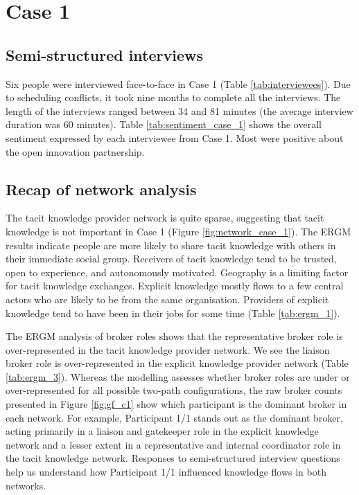 \section{Case 1}

\subsection{Semi-structured interviews}

Six people were interviewed face-to-face in Case 1 (Table \ref{tab:interviewees}). Due to scheduling conflicts, it took nine months to complete all the interviews. The length of the interviews ranged between 34 and 81 minutes (the average interview duration was 60 minutes). Table \ref{tab:sentiment_case_1} shows the overall sentiment expressed by each interviewee from Case 1. Most were positive about the open innovation partnership.

\subsection{Recap of network analysis}

The tacit knowledge provider network is quite sparse, suggesting that tacit knowledge is not important in Case 1 (Figure \ref{fig:network_case_1}). The ERGM results indicate people are more likely to share tacit knowledge with others in their immediate social group. Receivers of tacit knowledge tend to be trusted, open to experience, and autonomously motivated. Geography is a limiting factor for tacit knowledge exchanges. Explicit knowledge mostly flows to a few central actors who are likely to be from the same organisation. Providers of explicit knowledge tend to have been in their jobs for some time (Table \ref{tab:ergm_1}). \medskip

The ERGM analysis of broker roles shows that the representative broker role is over-represented in the tacit knowledge provider network. We see the liaison broker role is over-represented in the explicit knowledge provider network (Table \ref{tab:ergm_3}). Whereas the modelling assesses whether broker roles are under or over-represented for all possible two-path configurations, the raw broker counts presented in Figure \ref{fig:gf_c1} show which participant is the dominant broker in each network. For example, Participant 1/1 stands out as the dominant broker, acting primarily in a liaison and gatekeeper role in the explicit knowledge network and a lesser extent in a representative and internal coordinator role in the tacit knowledge network. Responses to semi-structured interview questions help us understand how Participant 1/1 influenced knowledge flows in both networks.  

